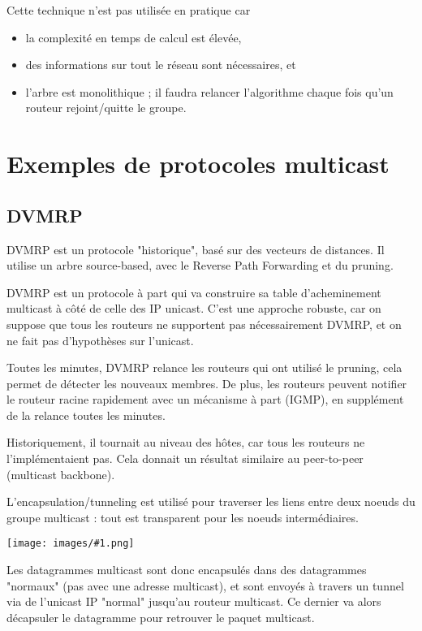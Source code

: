 \documentclass[10pt,a4paper]{report}
\newcommand{\dessin}[1]{\begin{center}\texttt{[image: images/\#1.png]}\end{center}}
\begin{document}
		Cette technique n'est pas utilisée en pratique car
		
		\begin{itemize}
			\item la complexité en temps de calcul est élevée,
			\item des informations sur tout le réseau sont nécessaires, et
			\item l'arbre est monolithique ; il faudra relancer l'algorithme chaque fois qu'un routeur rejoint/quitte le groupe.
		\end{itemize}
		
	\section{Exemples de protocoles multicast}
	
		\subsection{DVMRP}
		
		DVMRP est un protocole "historique", basé sur des vecteurs de distances. Il utilise un arbre source-based, avec le Reverse Path Forwarding et du pruning.
		
		DVMRP est un protocole à part qui va construire sa table d'acheminement multicast à côté de celle des IP unicast. C'est une approche robuste, car on suppose que tous les routeurs ne supportent pas nécessairement DVMRP, et on ne fait pas d'hypothèses sur l'unicast.
		
		Toutes les minutes, DVMRP relance les routeurs qui ont utilisé le pruning, cela permet de détecter les nouveaux membres. De plus, les routeurs peuvent notifier le routeur racine rapidement avec un mécanisme à part (IGMP), en supplément de la relance toutes les minutes.
		
		Historiquement, il tournait au niveau des hôtes, car tous les routeurs ne l'implémentaient pas. Cela donnait un résultat similaire au peer-to-peer (multicast backbone).
		
		L'encapsulation/tunneling est utilisé pour traverser les liens entre deux noeuds du groupe multicast : tout est transparent pour les noeuds intermédiaires.
		
		\dessin{137}
		
		Les datagrammes multicast sont donc encapsulés dans des datagrammes "normaux" (pas avec une adresse multicast), et sont envoyés à travers un tunnel via de l'unicast IP "normal" jusqu'au routeur multicast. Ce dernier va alors décapsuler le datagramme pour retrouver le paquet multicast.
			
\end{document}
